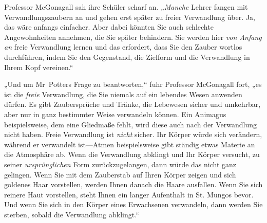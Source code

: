 Professor McGonagall sah ihre Schüler scharf an. \emph{„Manche} Lehrer fangen mit Verwandlungszaubern an und gehen erst später zu freier Verwandlung über. Ja, das wäre anfangs einfacher. Aber dabei könnten Sie auch schlechte Angewohnheiten annehmen, die Sie später behindern. Sie werden hier \emph{von Anfang an} freie Verwandlung lernen und das erfordert, dass Sie den Zauber wortlos durchführen, indem Sie den Gegenstand, die Zielform und die Verwandlung in Ihrem Kopf vereinen.“

„Und um Mr~Potters Frage zu beantworten,“ fuhr Professor McGonagall fort, „es ist die \emph{freie} Verwandlung, die Sie niemals auf ein lebendes Wesen anwenden dürfen. Es gibt Zaubersprüche und Tränke, die Lebewesen sicher und umkehrbar, aber nur in ganz bestimmter Weise verwandeln können. Ein Animagus beispielsweise, dem eine Gliedmaße fehlt, wird diese auch nach der Verwandlung nicht haben. Freie Verwandlung ist \emph{nicht} sicher. Ihr Körper würde sich verändern, während er verwandelt ist—Atmen beispielsweise gibt ständig etwas Materie an die Atmosphäre ab. Wenn die Verwandlung abklingt und Ihr Körper versucht, zu seiner \emph{ursprünglichen} Form zurückzugelangen, dann würde das nicht ganz gelingen. Wenn Sie mit dem Zauberstab auf Ihren Körper zeigen und sich goldenes Haar vorstellen, werden Ihnen danach die Haare ausfallen. Wenn Sie sich reinere Haut vorstellen, steht Ihnen ein langer Aufenthalt in St. Mungos bevor. Und wenn Sie sich in den Körper eines Erwachsenen verwandeln, dann werden Sie sterben, sobald die Verwandlung abklingt.“

